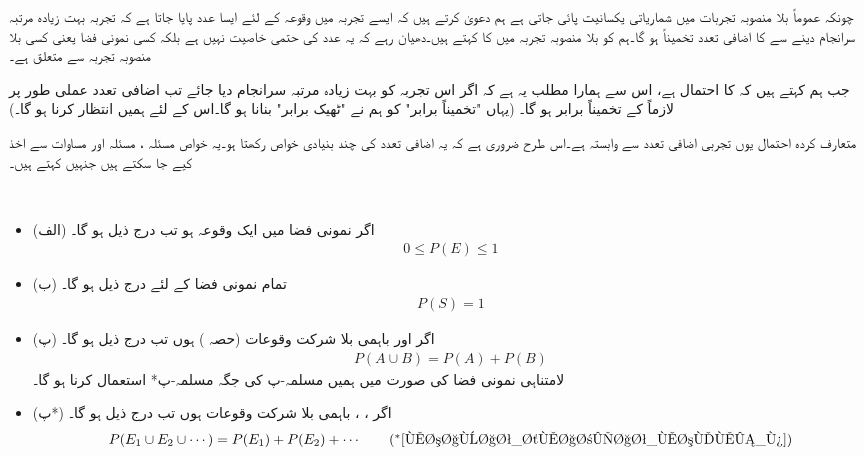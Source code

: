 چونکہ عموماً بلا منصوبہ تجربات میں شماریاتی یکسانیت پائی جاتی ہے ہم  دعویٰ کرتے ہیں کہ ایسے تجربہ میں وقوعہ  کے لئے ایسا عدد  پایا جاتا ہے کہ تجربہ بہت زیادہ مرتبہ سرانجام دینے سے   کا اضافی تعدد تخمیناً  ہو گا۔ہم  کو  بلا منصوبہ تجربہ میں  کا  کہتے ہیں۔دھیان رہے کہ یہ عدد  کی حتمی خاصیت نہیں ہے بلکہ کسی نمونی فضا  یعنی کسی بلا منصوبہ تجربہ سے متعلق ہے۔

جب ہم کہتے ہیں کہ  کا احتمال  ہے، اس سے ہمارا مطلب یہ ہے کہ اگر اس تجربہ کو بہت زیادہ مرتبہ سرانجام دیا جائے تب اضافی تعدد   عملی طور پر لازماً  کے تخمیناً برابر ہو گا۔ (یہاں "تخمیناً برابر"  کو ہم نے "ٹھیک برابر" بنانا ہو گا۔اس کے لئے ہمیں انتظار کرنا ہو گا۔)

متعارف کردہ احتمال یوں تجربی اضافی تعدد  سے وابستہ ہے۔اس طرح ضروری ہے کہ یہ اضافی تعدد کی چند بنیادی خواص رکھتا ہو۔یہ خواص مسئلہ ، مسئلہ  اور مساوات   سے اخذ کیے جا سکتے ہیں جنہیں  کہتے ہیں۔

\\
\begin{itemize}
\item{(الف)}
اگر نمونی فضا  میں  ایک وقوعہ ہو تب درج ذیل ہو گا۔
\begin{align}\label{مساوات_شماریات_مسلمہ_الف}
0\le P(E)\le 1
\end{align}
%
\item{(ب)}
تمام نمونی فضا کے لئے درج ذیل ہو گا۔
\begin{align}\label{مساوات_شماریات_مسلمہ_ب}
P(S)=1
\end{align}
%
\item{(پ)}
اگر   اور  باہمی بلا شرکت وقوعات (حصہ ) ہوں تب درج ذیل ہو گا۔
\begin{align}\label{مساوات_شماریات_مسلمہ_پ}
P(A\cup B)=P(A)+P(B)
\end{align}
%
لامتناہی نمونی فضا کی صورت میں ہمیں مسلمہ-پ کی جگہ مسلمہ-پ*  استعمال کرنا ہو گا۔
\item{(پ*)}
اگر ، ،  باہمی بلا شرکت وقوعات ہوں تب درج ذیل ہو گا۔
\begin{align*}
P(E_1\cup E_2 \cup\cdots)=P(E_1)+P(E_2)+\cdots  \tag{$^*$\ref{مساوات_شماریات_مسلمہ_پ}}
\end{align*}
\end{itemize}

